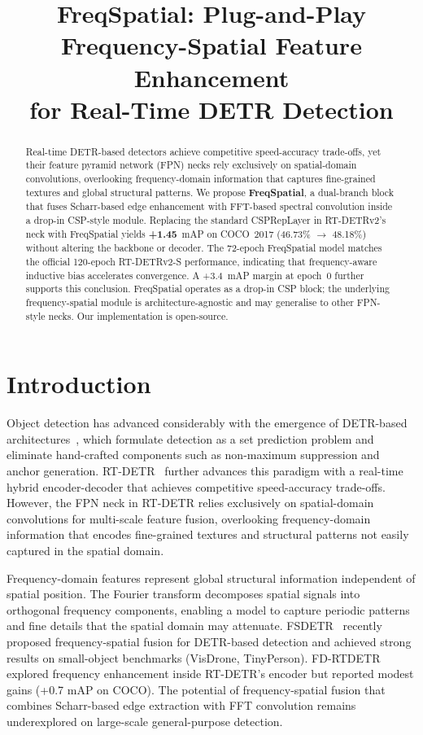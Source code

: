 \documentclass[10pt,twocolumn]{IEEEtran}
\title{FreqSpatial: Plug-and-Play Frequency-Spatial Feature Enhancement\\for Real-Time DETR Detection}
\author{\IEEEauthorblockN{Feiyang Xie}
\IEEEauthorblockA{Guilin University of Electronic Technology\\
Guilin, China\\
2316861994@qq.com}}
\begin{document}
\maketitle

\begin{abstract}
Real-time DETR-based detectors achieve competitive speed-accuracy trade-offs,
yet their feature pyramid network (FPN) necks rely exclusively on spatial-domain convolutions,
overlooking frequency-domain information that captures fine-grained textures and global structural patterns.
We propose \textbf{FreqSpatial}, a dual-branch block that fuses Scharr-based edge enhancement
with FFT-based spectral convolution inside a drop-in CSP-style module.
Replacing the standard CSPRepLayer in RT-DETRv2's neck with FreqSpatial
yields \textbf{+1.45}~mAP on COCO~2017 (46.73\% $\to$ 48.18\%)
without altering the backbone or decoder.
The 72-epoch FreqSpatial model matches the official 120-epoch RT-DETRv2-S performance,
indicating that frequency-aware inductive bias accelerates convergence.
A +3.4~mAP margin at epoch~0 further supports this conclusion.
FreqSpatial operates as a drop-in CSP block; the underlying frequency-spatial module
is architecture-agnostic and may generalise to other FPN-style necks.
Our implementation is open-source.
\end{abstract}

\section{Introduction}
\label{sec:intro}

Object detection has advanced considerably with the emergence of DETR-based
architectures~\cite{carion2020detr}, which formulate detection as a set prediction
problem and eliminate hand-crafted components such as non-maximum suppression
and anchor generation. RT-DETR~\cite{lv2023detrs} further advances this paradigm
with a real-time hybrid encoder-decoder that achieves
competitive speed-accuracy trade-offs. However, the FPN neck in RT-DETR
relies exclusively on spatial-domain convolutions for multi-scale feature
fusion, overlooking frequency-domain information that encodes
fine-grained textures and structural patterns not easily captured in the spatial domain.

Frequency-domain features represent global structural information independent of
spatial position. The Fourier transform decomposes spatial signals into orthogonal
frequency components, enabling a model to capture periodic patterns and fine details
that the spatial domain may attenuate. FSDETR~\cite{fsdetr} recently
proposed frequency-spatial fusion for DETR-based detection and achieved strong
results on small-object benchmarks (VisDrone, TinyPerson).
FD-RTDETR~\cite{wang2025fdrtdetr}
explored frequency enhancement inside RT-DETR's encoder but reported
modest gains (+0.7 mAP on COCO). The potential of frequency-spatial fusion
that combines Scharr-based edge extraction with FFT convolution remains underexplored
on large-scale general-purpose detection.
\end{document}
